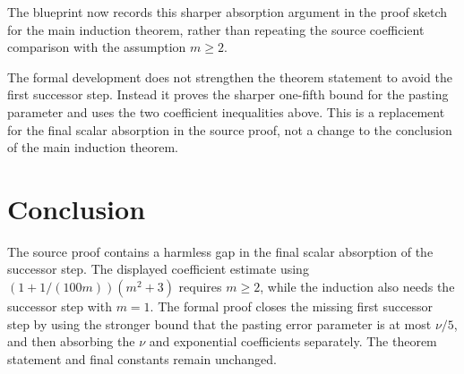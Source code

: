 \documentclass[11pt]{article}
\begin{document}
The blueprint now records this sharper absorption argument in the proof sketch
for the main induction theorem, rather than repeating the source coefficient
comparison with the assumption $m\ge2$.

The formal development does not strengthen the theorem statement to avoid the
first successor step. Instead it proves the sharper one-fifth bound for the
pasting parameter and uses the two coefficient inequalities above. This is a
replacement for the final scalar absorption in the source proof, not a change to
the conclusion of the main induction theorem.

\section{Conclusion}

The source proof contains a harmless gap in the final scalar absorption of the
successor step. The displayed coefficient estimate using
$\left(1+1/(100m)\right)(m^2+3)$ requires $m\ge2$, while the induction also needs
the successor step with $m=1$. The formal proof closes the missing first
successor step by using the stronger bound that the pasting error parameter is at
most $\nu/5$, and then absorbing the $\nu$ and exponential coefficients
separately. The theorem statement and final constants remain unchanged.



\end{document}
